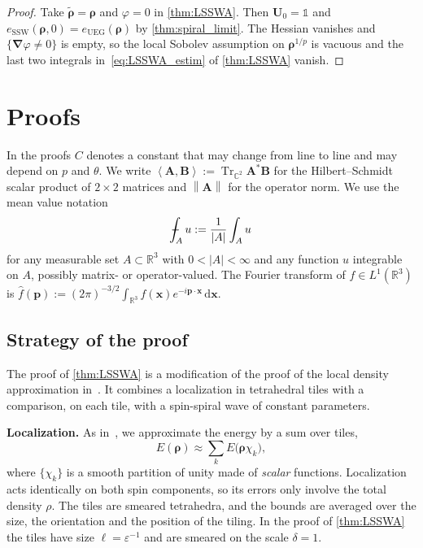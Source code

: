 \documentclass[final,reqno]{amsart}
\theoremstyle{remark}
\renewcommand{\epsilon}{\varepsilon}
\newcommand{\wt}[1]{\widetilde{#1}}
\newcommand{\wh}[1]{\widehat{#1}}
\DeclareMathOperator{\Tr}{Tr}
\newcommand{\Trs}{\Tr_{\CC^2}}
\newcommand{\RR}{\mathbb{R}}
\newcommand{\CC}{\mathbb{C}}
\newcommand{\UEG}{\mathrm{UEG}}
\newcommand{\SSW}{\mathrm{SSW}}
\newcommand{\pscal}[1]{\left\langle #1 \right\rangle}
\newcommand{\norm}[1]{\left\| #1 \right\|}
\newcommand{\iden}{\mathbb{1}}
\newcommand{\grad}{\bm{\nabla}}
\newcommand{\dd}{\mathrm{d}}
\def\Xint#1{\mathchoice
{\XXint\displaystyle\textstyle{#1}}
{\XXint\textstyle\scriptstyle{#1}}
{\XXint\scriptstyle\scriptscriptstyle{#1}}
{\XXint\scriptscriptstyle\scriptscriptstyle{#1}}
\!\int}
\def\XXint#1#2#3{{\setbox0=\hbox{$#1{#2#3}{\int}$ }
\vcenter{\hbox{$#2#3$ }}\kern-.6\wd0}}
\def\dashint{\Xint-}
\begin{document}
\begin{proof}
Take $\wt{\bm{\rho}}=\bm{\rho}$ and $\varphi=0$ in \cref{thm:LSSWA}. Then $\mathbf{U}_0=\iden$ and $e_\SSW(\bm{\rho},0)=e_\UEG(\bm{\rho})$ by \cref{thm:spiral_limit}. The Hessian vanishes and $\{\grad\varphi\ne0\}$ is empty, so the local Sobolev assumption on $\bm{\rho}^{1/p}$ is vacuous and the last two integrals in~\cref{eq:LSSWA_estim} of \cref{thm:LSSWA} vanish.
\end{proof}

\section{Proofs}\label{sec:proof}
In the proofs $C$ denotes a constant that may change from line to line and may depend on $p$ and $\theta$. We write $\pscal{\mathbf{A},\mathbf{B}}:=\Trs\mathbf{A}^*\mathbf{B}$ for the Hilbert--Schmidt scalar product of $2\times2$ matrices and $\norm{\mathbf{A}}$ for the operator norm. We use the mean value notation
$$
\dashint_A u:=\frac{1}{|A|}\int_A u
$$
for any measurable set $A\subset\RR^3$ with $0<|A|<\infty$ and any function $u$ integrable on $A$, possibly matrix- or operator-valued. The Fourier transform of $f\in L^1(\RR^3)$ is $\wh{f}(\mathbf{p}):=(2\pi)^{-3/2}\int_{\RR^3}f(\mathbf{x})e^{-i\mathbf{p}\cdot\mathbf{x}}\,\dd\mathbf{x}$.

\subsection{Strategy of the proof}\label{sec:strategy}
The proof of \cref{thm:LSSWA} is a modification of the proof of the local density approximation in~\cite[Theorem~3]{lewin2020local}. It combines a localization in tetrahedral tiles with a comparison, on each tile, with a spin-spiral wave of constant parameters.

\medskip

\noindent\textbf{Localization.} As in~\cite[Section 4]{lewin2020local}, we approximate the energy by a sum over tiles,
\begin{equation*}
E(\bm{\rho})\approx \sum_k  E\big(\bm{\rho}\chi_k\big),
\end{equation*}
where $\{\chi_k\}$ is a smooth partition of unity made of \emph{scalar} functions. Localization acts identically on both spin components, so its errors only involve the total density $\rho$. The tiles are smeared tetrahedra, and the bounds are averaged over the size, the orientation and the position of the tiling. In the proof of \cref{thm:LSSWA} the tiles have size $\ell=\epsilon^{-1}$ and are smeared on the scale $\delta=1$.
\end{document}
